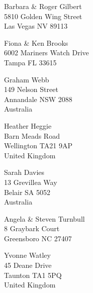 \documentclass{article}
\begin{document}
\begin{center}
\begin{Huge}

\vspace*{\fill}
Barbara \& Roger Gilbert\\
5810 Golden Wing Street\\
Las Vegas NV 89113\\
\vspace{\fill}

\clearpage

\vspace*{\fill}
Fiona \& Ken Brooks\\
6002 Mariners Watch Drive\\
Tampa FL 33615\\
\vspace{\fill}

\clearpage

\vspace*{\fill}
Graham Webb\\
149 Nelson Street\\
Annandale NSW 2088\\
Australia
\vspace{\fill}

\clearpage

\vspace*{\fill}
Heather Heggie\\
Barn Meads Road\\
Wellington TA21 9AP\\
United Kingdom
\vspace{\fill}

\clearpage

\vspace*{\fill}
Sarah Davies\\
13 Grevillea Way\\
Belair SA 5052\\
Australia
\vspace{\fill}

\clearpage

\vspace*{\fill}
Angela \& Steven Turnbull\\
8 Graybark Court\\
Greensboro NC 27407\\
\vspace{\fill}

\clearpage

\vspace*{\fill}
Yvonne Watley\\
45 Deane Drive\\
Taunton TA1 5PQ\\
United Kingdom
\vspace{\fill}


\end{Huge}
\end{center}
\end{document}
